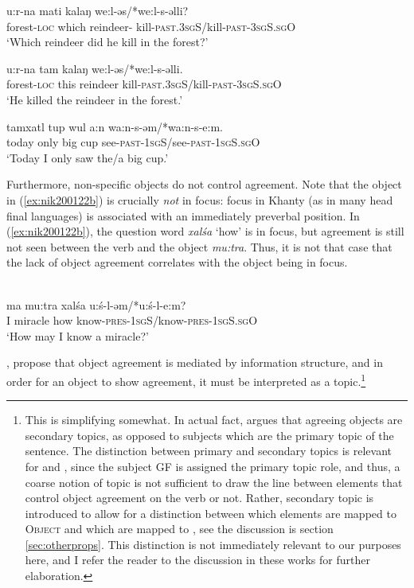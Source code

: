 \documentclass[output=paper
,modfonts
,nonflat]{langsci/langscibook}
\begin{document}
\begin{exe}
\ex \citet[][143]{dn2011}
\begin{xlist}
\ex
{\gll u:r-na mati kalaŋ we:l-əs/*we:l-s-əlli?\\
forest-\textsc{loc} which reindeer- kill-\textsc{past.3sgS}/kill-\textsc{past-3sgS.sgO}\\
\glt `Which reindeer did he kill in the forest?'} \label{ex:focwh}

\ex
{\gll u:r-na tam kalaŋ we:l-əs/*we:l-s-əlli.\\
forest-\textsc{loc} this reindeer kill-\textsc{past.3sgS}/kill-\textsc{past-3sgS.sgO}\\
\glt `He killed the reindeer in the forest.'} \label{ex:focanswer}

\ex
{\gll tamxatl tup wul a:n wa:n-s-əm/*wa:n-s-e:m.\\
today only big cup see-\textsc{past-1sgS}/see-\textsc{past-1sgS.sgO}\\
\glt `Today I only saw the/a big cup.'} \label{ex:focpart}
\end{xlist} 
\end{exe}

\noindent Furthermore, non-specific objects do not control agreement.
Note that the object in (\ref{ex:nik200122b}) is crucially \emph{not} in focus: focus in Khanty (as in many head final languages) is associated with an immediately preverbal position. 
In (\ref{ex:nik200122b}), the question word \emph{xal\'{s}a} `how' is in focus, but agreement is still not seen between the verb and the object \emph{mu:tra}.
Thus, it is not that case that the lack of object agreement correlates with the object being in focus.

\begin{exe}
\ex \citet[][20]{nikolaeva2001}\\
{\gll ma mu:tra xal\'{s}a u:\'{s}-l-əm/*u:\'{s}-l-e:m?\\
I miracle how know-\textsc{pres-1sgS}/know-\textsc{pres-1sgS.sgO}\\
\glt `How may I know a miracle?'} \label{ex:nik200122b}
\end{exe}


\noindent \citet{nikolaeva2001}, \citet{dn2011} propose that object agreement is mediated by information structure, and in order for an object to show agreement, it must be interpreted as a topic.\footnote{This is simplifying somewhat.
In actual fact, \citet{nikolaeva2001} argues that agreeing objects are secondary topics, as opposed to subjects which are the primary topic of the sentence.
The distinction between primary and secondary topics is relevant for \cite{nikolaeva2001} and \cite{dn2011}, since the subject GF is assigned the primary topic role, and thus, a coarse notion of topic is not sufficient to draw the line between elements that control object agreement on the verb or not.
Rather, secondary topic is introduced to allow for a distinction between which elements are mapped to \textsc{Object} and which are mapped to \robj, see the discussion is section \ref{sec:otherprops}.
This distinction is not immediately relevant to our purposes here, and I refer the reader to the discussion in these works for further elaboration.}
\end{document}
